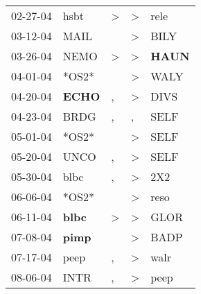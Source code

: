 \begin{supertabular}{p{0.07\textwidth}p{0.06\textwidth}p{0.02\textwidth}p{0.02\textwidth}p{0.06\textwidth}}
          02-27-04\textsuperscript{} &           hsbt\textsuperscript{} &     \textgreater &     \textgreater &           rele\textsuperscript{} \\
          03-12-04\textsuperscript{} &           MAIL\textsuperscript{} &                  &     \textgreater &           BILY\textsuperscript{} \\
          03-26-04\textsuperscript{} &           NEMO\textsuperscript{} &     \textgreater &     \textgreater &  \textbf{HAUN\textsuperscript{}} \\
          04-01-04\textsuperscript{} &                            *OS2* &                  &     \textgreater &           WALY\textsuperscript{} \\
          04-20-04\textsuperscript{} &  \textbf{ECHO\textsuperscript{}} &                , &     \textgreater &           DIVS\textsuperscript{} \\
          04-23-04\textsuperscript{} &           BRDG\textsuperscript{} &                , &                , &           SELF\textsuperscript{} \\
          05-01-04\textsuperscript{} &                            *OS2* &                  &     \textgreater &           SELF\textsuperscript{} \\
          05-20-04\textsuperscript{} &           UNCO\textsuperscript{} &                , &     \textgreater &           SELF\textsuperscript{} \\
          05-30-04\textsuperscript{} &           blbc\textsuperscript{} &                , &     \textgreater &            2X2\textsuperscript{} \\
          06-06-04\textsuperscript{} &                            *OS2* &                  &     \textgreater &           reso\textsuperscript{} \\
          06-11-04\textsuperscript{} &  \textbf{blbc\textsuperscript{}} &     \textgreater &     \textgreater &           GLOR\textsuperscript{} \\
          07-08-04\textsuperscript{} &  \textbf{pimp\textsuperscript{}} &                  &     \textgreater &           BADP\textsuperscript{} \\
          07-17-04\textsuperscript{} &           peep\textsuperscript{} &                , &     \textgreater &           walr\textsuperscript{} \\
          08-06-04\textsuperscript{} &           INTR\textsuperscript{} &                , &     \textgreater &           peep\textsuperscript{} \\

\end{supertabular}

